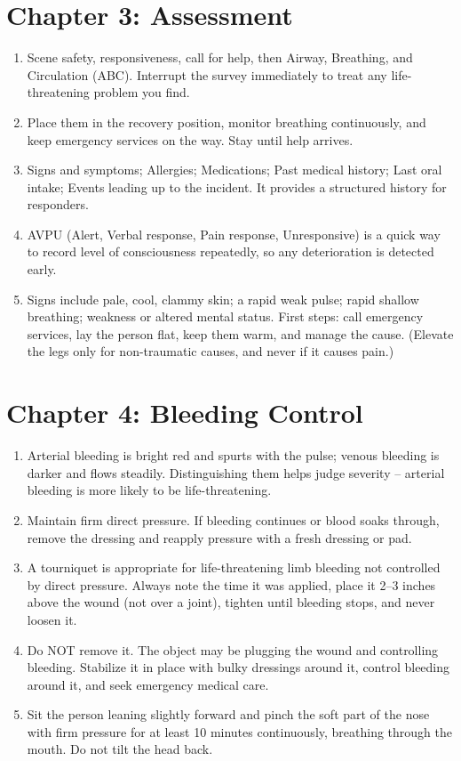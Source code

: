 \section*{Chapter 3: Assessment}

\begin{enumerate}[leftmargin=*]
\item Scene safety, responsiveness, call for help, then Airway, Breathing, and Circulation (ABC). Interrupt the survey immediately to treat any life-threatening problem you find.
\item Place them in the recovery position, monitor breathing continuously, and keep emergency services on the way. Stay until help arrives.
\item Signs and symptoms; Allergies; Medications; Past medical history; Last oral intake; Events leading up to the incident. It provides a structured history for responders.
\item AVPU (Alert, Verbal response, Pain response, Unresponsive) is a quick way to record level of consciousness repeatedly, so any deterioration is detected early.
\item Signs include pale, cool, clammy skin; a rapid weak pulse; rapid shallow breathing; weakness or altered mental status. First steps: call emergency services, lay the person flat, keep them warm, and manage the cause. (Elevate the legs only for non-traumatic causes, and never if it causes pain.)
\end{enumerate}

\section*{Chapter 4: Bleeding Control}

\begin{enumerate}[leftmargin=*]
\item Arterial bleeding is bright red and spurts with the pulse; venous bleeding is darker and flows steadily. Distinguishing them helps judge severity -- arterial bleeding is more likely to be life-threatening.
\item Maintain firm direct pressure. If bleeding continues or blood soaks through, remove the dressing and reapply pressure with a fresh dressing or pad.
\item A tourniquet is appropriate for life-threatening limb bleeding not controlled by direct pressure. Always note the time it was applied, place it 2--3 inches above the wound (not over a joint), tighten until bleeding stops, and never loosen it.
\item Do NOT remove it. The object may be plugging the wound and controlling bleeding. Stabilize it in place with bulky dressings around it, control bleeding around it, and seek emergency medical care.
\item Sit the person leaning slightly forward and pinch the soft part of the nose with firm pressure for at least 10 minutes continuously, breathing through the mouth. Do not tilt the head back.
\end{enumerate}

